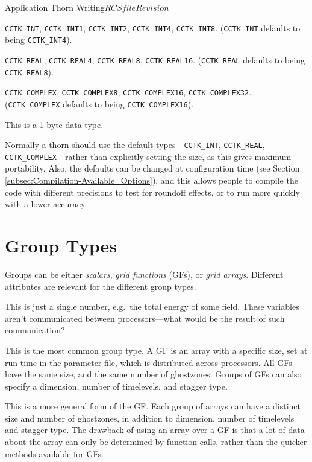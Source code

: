 \begin{cactuspart}{Application Thorn Writing}{$RCSfile$}{$Revision$}
\begin{Lentry}
\item[INTEGER]
\texttt{CCTK\_INT}, \texttt{CCTK\_INT1}, \texttt{CCTK\_INT2}, \texttt{CCTK\_INT4}, \texttt{CCTK\_INT8}.
(\texttt{CCTK\_INT} defaults to being \texttt{CCTK\_INT4}).
\item[REAL]
\texttt{CCTK\_REAL}, \texttt{CCTK\_REAL4}, \texttt{CCTK\_REAL8}, \texttt{CCTK\_REAL16}.  (\texttt{CCTK\_REAL} defaults to being \texttt{CCTK\_REAL8}).
\item[COMPLEX]
\texttt{CCTK\_COMPLEX}, \texttt{CCTK\_COMPLEX8}, \texttt{CCTK\_COMPLEX16}, \texttt{CCTK\_COMPLEX32}.
(\texttt{CCTK\_COMPLEX} defaults to being \texttt{CCTK\_COMPLEX16}).
\item[BYTE]
This is a 1 byte data type.
\end{Lentry}

Normally a thorn should use the default types---\texttt{CCTK\_INT}, \texttt{CCTK\_REAL}, \texttt{CCTK\_COMPLEX}---rather than explicitly setting the size, as this gives maximum
portability. Also, the defaults can be changed at configuration time (see Section
\ref{subsec:Compilation-Available_Options}), and this allows people to compile the
code with different precisions to test for roundoff effects, or to run more
quickly with a lower accuracy.


\section{Group Types}
\label{sec:cactus_variables-groups}

Groups can be either \textit{scalars}, \textit{grid functions} (GFs), or
\textit{grid arrays}. Different attributes are relevant for the different group
types.


\begin{Lentry}
\item[\texttt{SCALAR}]
This is just a single number, e.g.\ the total energy of some field.  These
variables aren't communicated between processors---what would be the
result of such communication?
\item[\texttt{GF}]
This is the most common group type.  A GF is an array with a
specific size, set at run time in the parameter file, which is distributed
across processors.  All GFs have the same size, and the same number of
ghostzones. Groups of GFs can also specify a dimension,
number of timelevels, and stagger type.
\item[\texttt{ARRAY}]
This is a more general form of the GF.  Each group of arrays can have
a distinct size and number of ghostzones, in addition to dimension,
number of timelevels and stagger type.
The drawback of using an array over a GF is that a lot of data about the
array can only be determined by function calls, rather than the
quicker methods available for GFs.
\end{Lentry}


\end{cactuspart}
